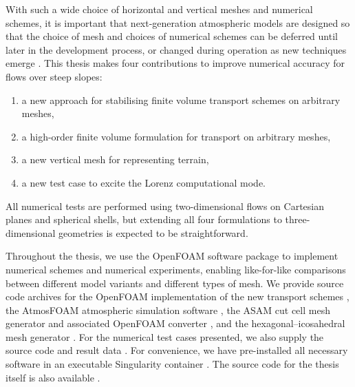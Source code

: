 With such a wide choice of horizontal and vertical meshes and numerical schemes, it is important that next-generation atmospheric models are designed so that the choice of mesh and choices of numerical schemes can be deferred until later in the development process, or changed during operation as new techniques emerge \citep{ford2013, theurich2016}.
This thesis makes four contributions to improve numerical accuracy for flows over steep slopes:
\begin{enumerate}
\item a new approach for stabilising finite volume transport schemes on arbitrary meshes,
\item a high-order finite volume formulation for transport on arbitrary meshes,
\item a new vertical mesh for representing terrain,
\item a new test case to excite the Lorenz computational mode.
\end{enumerate}
All numerical tests are performed using two-dimensional flows on Cartesian planes and spherical shells, but extending all four formulations to three-dimensional geometries is expected to be straightforward.

Throughout the thesis, we use the OpenFOAM software package  to implement numerical schemes and numerical experiments, enabling like-for-like comparisons between different model variants and different types of mesh.
We provide source code archives for the OpenFOAM implementation of the new transport schemes \citep{cubicFit,highOrderFit}, the AtmosFOAM atmospheric simulation software \citep{atmosfoam,atmosfoam-tools}, the ASAM cut cell mesh generator \citep{asam_grid} and associated OpenFOAM converter \citep{gmv2openfoam}, and the hexagonal–icosahedral mesh generator \citep{geodesic-mesh}.
For the numerical test cases presented, we also supply the source code \citep{atmostests} and result data \citep{atmostests-results}.
For convenience, we have pre-installed all necessary software in an executable Singularity container \citep{atmostests-singularity}.
The source code for the thesis itself is also available \citep{thesis}.

